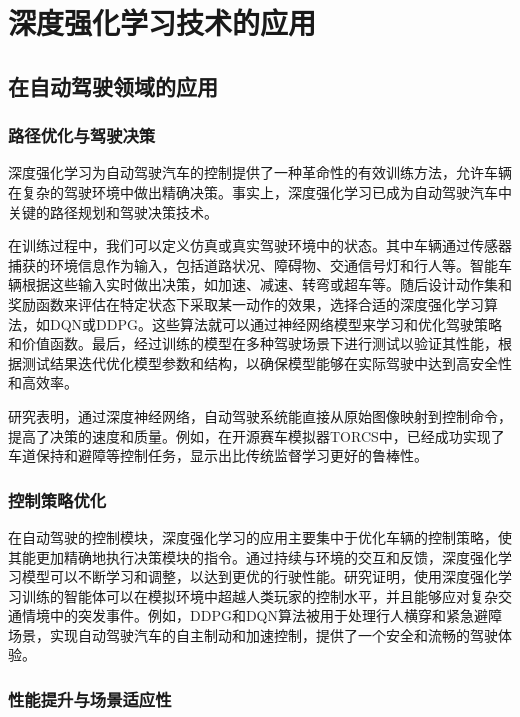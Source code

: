 \section{深度强化学习技术的应用}

\subsection{在自动驾驶领域的应用}

\subsubsection{路径优化与驾驶决策}

深度强化学习为自动驾驶汽车的控制提供了一种革命性的有效训练方法，允许车辆在复杂的驾驶环境中做出精确决策。事实上，深度强化学习已成为自动驾驶汽车中关键的路径规划和驾驶决策技术。

在训练过程中，我们可以定义仿真或真实驾驶环境中的状态。其中车辆通过传感器捕获的环境信息作为输入，包括道路状况、障碍物、交通信号灯和行人等。智能车辆根据这些输入实时做出决策，如加速、减速、转弯或超车等。随后设计动作集和奖励函数来评估在特定状态下采取某一动作的效果，选择合适的深度强化学习算法，如DQN或DDPG。这些算法就可以通过神经网络模型来学习和优化驾驶策略和价值函数。最后，经过训练的模型在多种驾驶场景下进行测试以验证其性能，根据测试结果迭代优化模型参数和结构，以确保模型能够在实际驾驶中达到高安全性和高效率。

研究表明，通过深度神经网络，自动驾驶系统能直接从原始图像映射到控制命令，提高了决策的速度和质量。例如，在开源赛车模拟器TORCS中，已经成功实现了车道保持和避障等控制任务，显示出比传统监督学习更好的鲁棒性。

\subsubsection{控制策略优化}

在自动驾驶的控制模块，深度强化学习的应用主要集中于优化车辆的控制策略，使其能更加精确地执行决策模块的指令。通过持续与环境的交互和反馈，深度强化学习模型可以不断学习和调整，以达到更优的行驶性能。研究证明，使用深度强化学习训练的智能体可以在模拟环境中超越人类玩家的控制水平，并且能够应对复杂交通情境中的突发事件。例如，DDPG和DQN算法被用于处理行人横穿和紧急避障场景，实现自动驾驶汽车的自主制动和加速控制，提供了一个安全和流畅的驾驶体验。

\subsubsection{性能提升与场景适应性}

